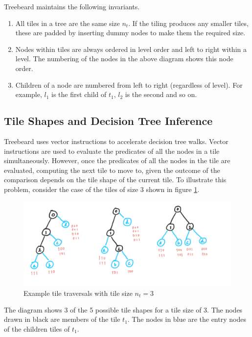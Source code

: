Treebeard maintains the following invariants.
\begin{enumerate}
  \item All tiles in a tree are the same size $n_t$. If the tiling produces any smaller tiles, these are padded by inserting dummy nodes to make them the required size.
  \item Nodes within tiles are always ordered in level order and left to right within a level. The numbering of the nodes in the above diagram shows this node order.
  \item Children of a node are numbered from left to right (regardless of level). For example, $l_1$ is the first child of $t_1$, $l_2$ is the second and so on.
\end{enumerate}
    
\subsection{Tile Shapes and Decision Tree Inference}
\label{Sec:TileShapesAndDecisionTreeInference}
Treebeard uses vector instructions to accelerate decision tree walks. Vector instructions are used to evaluate the predicates of all the nodes in a tile simultaneously. However, once the predicates of all the nodes in the tile are evaluated, computing the next tile to move to, given the outcome of the comparison depends on the tile shape of the current tile. To illustrate this problem, consider the case of the tiles of size 3 shown in figure \ref{Fig:TileTraversalTileSize3}. 
\begin{figure}
  \centering
  \includegraphics[width=\linewidth]{figures/TileTraversal_Size3.PNG}
  \caption{Example tile traversals with tile size $n_t=3$}
  \label{Fig:TileTraversalTileSize3}
\end{figure}
The diagram shows 3 of the 5 possible tile shapes for a tile size of 3. The nodes drawn in black are members of the tile $t_1$. The nodes in blue are the entry nodes of the children tiles of $t_1$. 

